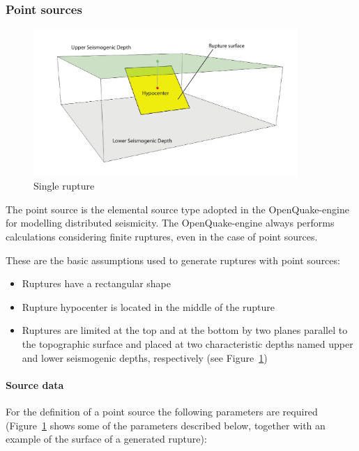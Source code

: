 \subsubsection{Point sources}
\label{subsubsec:point_sources}

\begin{figure}[!ht]
\centering
\includegraphics[width=10cm]{figures/hazard/single_rupture.pdf}
\caption{Single rupture}
\label{fig:single_rupture}
\end{figure}

The point source is the elemental source type adopted in the OpenQuake-engine
for modelling distributed seismicity. The OpenQuake-engine always performs
calculations considering finite ruptures, even in the case of point sources.

These are the basic assumptions used to generate ruptures with point sources:

\begin{itemize}

    \item Ruptures have a rectangular shape

    \item Rupture hypocenter is located in the middle of the rupture

    \item Ruptures are limited at the top and at the bottom by two planes
    parallel to the topographic surface and placed at two characteristic
    depths named upper and lower seismogenic depths, respectively (see
    Figure~\ref{fig:single_rupture})

\end{itemize}

\paragraph{Source data}

For the definition of a point source the following parameters are required
(Figure~\ref{fig:single_rupture} shows some of the parameters described
below, together with an example of the surface of a generated rupture):

